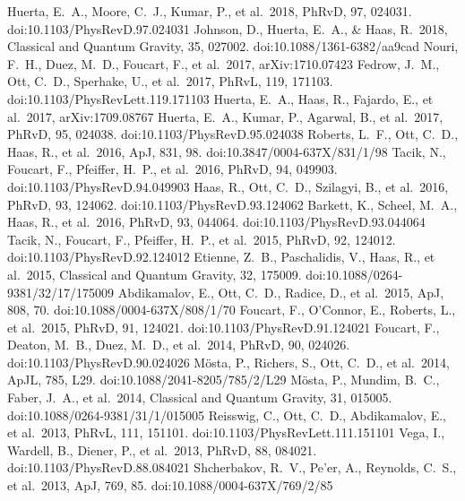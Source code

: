 \documentclass[11pt,a4paper,roman]{moderncv}        %
\newcommand\apj{\textrm{ApJ}}%
\newcommand\apjl{\textrm{ApJL}}     %
\newcommand\prd{\textrm{PhRvD}}%
\newcommand\prl{\textrm{PhRvL}}%
\begin{document}
\begin{thebibliography}{99}
 Huerta, E.~A., Moore, C.~J., Kumar, P., et al.\ 2018, \prd, 97, 024031. doi:10.1103/PhysRevD.97.024031
 Johnson, D., Huerta, E.~A., \& Haas, R.\ 2018, Classical and Quantum Gravity, 35, 027002. doi:10.1088/1361-6382/aa9cad
 Nouri, F.~H., Duez, M.~D., Foucart, F., et al.\ 2017, arXiv:1710.07423
 Fedrow, J.~M., Ott, C.~D., Sperhake, U., et al.\ 2017, \prl, 119, 171103. doi:10.1103/PhysRevLett.119.171103
 Huerta, E.~A., Haas, R., Fajardo, E., et al.\ 2017, arXiv:1709.08767
 Huerta, E.~A., Kumar, P., Agarwal, B., et al.\ 2017, \prd, 95, 024038. doi:10.1103/PhysRevD.95.024038
 Roberts, L.~F., Ott, C.~D., Haas, R., et al.\ 2016, \apj, 831, 98. doi:10.3847/0004-637X/831/1/98
 Tacik, N., Foucart, F., Pfeiffer, H.~P., et al.\ 2016, \prd, 94, 049903. doi:10.1103/PhysRevD.94.049903
 Haas, R., Ott, C.~D., Szilagyi, B., et al.\ 2016, \prd, 93, 124062. doi:10.1103/PhysRevD.93.124062
 Barkett, K., Scheel, M.~A., Haas, R., et al.\ 2016, \prd, 93, 044064. doi:10.1103/PhysRevD.93.044064
 Tacik, N., Foucart, F., Pfeiffer, H.~P., et al.\ 2015, \prd, 92, 124012. doi:10.1103/PhysRevD.92.124012
 Etienne, Z.~B., Paschalidis, V., Haas, R., et al.\ 2015, Classical and Quantum Gravity, 32, 175009. doi:10.1088/0264-9381/32/17/175009
 Abdikamalov, E., Ott, C.~D., Radice, D., et al.\ 2015, \apj, 808, 70. doi:10.1088/0004-637X/808/1/70
 Foucart, F., O'Connor, E., Roberts, L., et al.\ 2015, \prd, 91, 124021. doi:10.1103/PhysRevD.91.124021
 Foucart, F., Deaton, M.~B., Duez, M.~D., et al.\ 2014, \prd, 90, 024026. doi:10.1103/PhysRevD.90.024026
 M{\"o}sta, P., Richers, S., Ott, C.~D., et al.\ 2014, \apjl, 785, L29. doi:10.1088/2041-8205/785/2/L29
 M{\"o}sta, P., Mundim, B.~C., Faber, J.~A., et al.\ 2014, Classical and Quantum Gravity, 31, 015005. doi:10.1088/0264-9381/31/1/015005
 Reisswig, C., Ott, C.~D., Abdikamalov, E., et al.\ 2013, \prl, 111, 151101. doi:10.1103/PhysRevLett.111.151101
 Vega, I., Wardell, B., Diener, P., et al.\ 2013, \prd, 88, 084021. doi:10.1103/PhysRevD.88.084021
 Shcherbakov, R.~V., Pe'er, A., Reynolds, C.~S., et al.\ 2013, \apj, 769, 85. doi:10.1088/0004-637X/769/2/85

\end{thebibliography}
\end{document}
